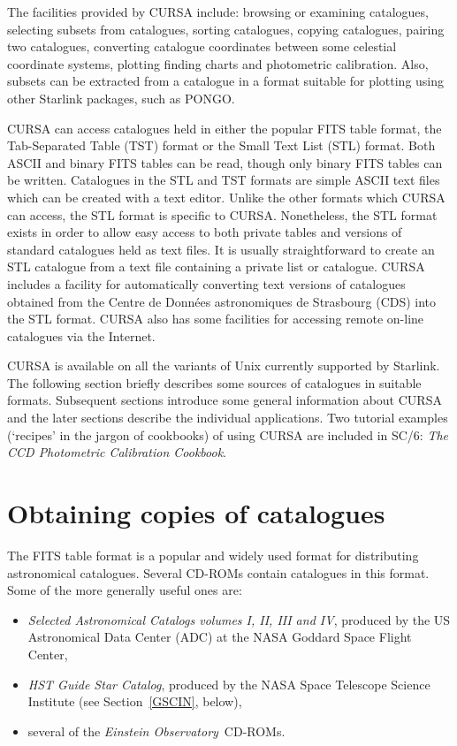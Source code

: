 \documentclass[twoside,11pt]{article}
\newcommand{\xref}[3]{#1}
\newcommand{\xlabel}[1]{}
\renewcommand{\_}{\texttt{\symbol{95}}}
\begin{document}
The facilities provided by CURSA include: browsing or examining catalogues,
selecting subsets from catalogues, sorting catalogues, copying catalogues,
pairing two catalogues, converting catalogue coordinates between some
celestial coordinate systems, plotting finding charts and photometric
calibration.  Also, subsets can be extracted from a catalogue in a format
suitable for plotting using other Starlink packages, such as PONGO. 

CURSA can access catalogues held in either the popular FITS table format,
the Tab-Separated Table (TST) format or the Small Text List (STL) format.
Both ASCII and binary FITS tables can be read, though only binary FITS
tables can be written.  Catalogues in the STL and TST formats are simple
ASCII text files which can be created with a text editor.  Unlike the other
formats which CURSA can access, the STL format is specific to CURSA.
Nonetheless, the STL format exists in order to allow easy access to both
private tables and versions of standard catalogues held as text files.  It
is usually straightforward to create an STL catalogue from a text file
containing a private list or catalogue.  CURSA includes a facility for
automatically converting text versions of catalogues obtained from the
Centre de Donn\'{e}es astronomiques de Strasbourg (CDS) into the STL format.
CURSA also has some facilities for accessing remote on-line catalogues via
the Internet.

CURSA is available on all the variants of Unix currently supported by
Starlink.  The following section briefly describes some sources of
catalogues in suitable formats.  Subsequent sections introduce
some general information about CURSA and the later sections describe the
individual applications.  Two tutorial examples (`recipes' in the jargon
of cookbooks) of using CURSA are included in \xref{SC/6: {\it The CCD
Photometric Calibration Cookbook}}{sc6}{}\/\cite{SC6}.


\section{\label{OBTAIN}\xlabel{OBTAIN}Obtaining copies of catalogues}

The FITS table format is a popular and widely used format for
distributing astronomical catalogues. Several CD-ROMs contain catalogues
in this format.  Some of the more generally useful ones are:

\begin{itemize}

  \item {\it Selected Astronomical Catalogs volumes I, II, III and IV},
   produced by the US Astronomical Data Center (ADC) at the NASA Goddard
   Space Flight Center, 

  \item {\it HST Guide Star Catalog}, produced by the NASA Space Telescope 
   Science Institute (see Section~\ref{GSCIN}, below),

  \item several of the {\it Einstein Observatory}\, CD-ROMs.

\end{itemize}
\end{document}
